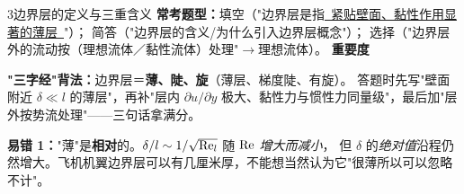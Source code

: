 \begin{kaodian}{3}{边界层的定义与三重含义}
\textbf{常考题型：}填空（"边界层是指\underline{\ 紧贴壁面、黏性作用显著的薄层\ }"）；
简答（"边界层的含义/为什么引入边界层概念"）；
选择（"边界层外的流动按（理想流体／黏性流体）处理"$\to$理想流体）。
\textbf{重要度 }\quad{}\quad{}

\begin{banfa}
\textbf{"三字经"背法：}边界层＝\textbf{薄、陡、旋}（薄层、梯度陡、有旋）。
答题时先写"壁面附近 $\delta\ll l$ 的薄层"，再补"层内 $\partial u/\partial y$ 极大、黏性力与惯性力同量级"，最后加"层外按势流处理"——三句话拿满分。
\end{banfa}

\begin{yicuo}
\textbf{易错 1：}"薄"是\textbf{相对}的。$\delta/l\sim1/\sqrt{\mathrm{Re}_l}$ 随 $\mathrm{Re}$ \emph{增大而减小}，
但 $\delta$ 的\emph{绝对值}沿程仍然增大。飞机机翼边界层可以有几厘米厚，不能想当然认为它"很薄所以可以忽略不计"。
\end{yicuo}
\end{kaodian}

